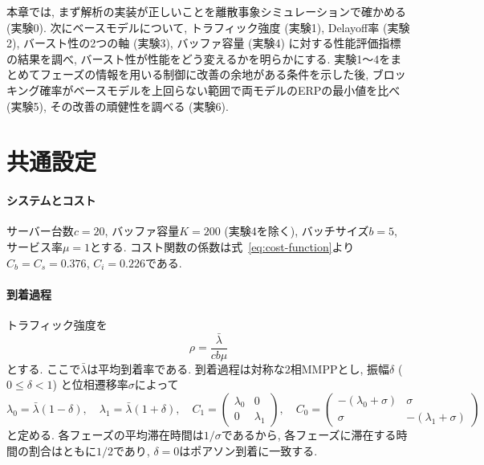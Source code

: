 \documentclass[a4paper, 11pt, dvipdfmx]{jsreport}
\begin{document}
本章では, まず解析の実装が正しいことを離散事象シミュレーションで確かめる (実験0).
次にベースモデルについて, トラフィック強度 (実験1), Delayoff率 (実験2), バースト性の2つの軸
(実験3), バッファ容量 (実験4) に対する性能評価指標の結果を調べ, バースト性が性能をどう変えるかを明らかにする.
実験1〜4をまとめてフェーズの情報を用いる制御に改善の余地がある条件を示した後,
ブロッキング確率がベースモデルを上回らない範囲で両モデルのERPの最小値を比べ (実験5), その改善の頑健性を調べる (実験6).

\section{共通設定}
\label{sec:common-setup}

\paragraph{システムとコスト}
サーバー台数$c=20$, バッファ容量$K=200$ (実験4を除く), バッチサイズ$b=5$, サービス率$\mu=1$とする.
コスト関数の係数は式~\eqref{eq:cost-function}より
$C_b = C_s = 0.376$, $C_i = 0.226$である.

\paragraph{到着過程}
トラフィック強度を
\begin{equation}
    \rho = \frac{\bar{\lambda}}{c b \mu}
    \label{eq:traffic-intensity}
\end{equation}
とする. ここで$\bar{\lambda}$は平均到着率である. 到着過程は対称な2相MMPPとし, 振幅$\delta$
($0 \le \delta < 1$) と位相遷移率$\sigma$によって
\begin{equation}
    \lambda_0 = \bar{\lambda}(1 - \delta), \quad
    \lambda_1 = \bar{\lambda}(1 + \delta), \quad
    C_1 = \begin{pmatrix} \lambda_0 & 0 \\ 0 & \lambda_1 \end{pmatrix}, \quad
    C_0 = \begin{pmatrix} -(\lambda_0 + \sigma) & \sigma \\ \sigma & -(\lambda_1 + \sigma) \end{pmatrix}
    \label{eq:mmpp-2phase}
\end{equation}
と定める. 各フェーズの平均滞在時間は$1/\sigma$であるから,
各フェーズに滞在する時間の割合はともに$1/2$であり, $\delta = 0$はポアソン到着に一致する.
\end{document}
